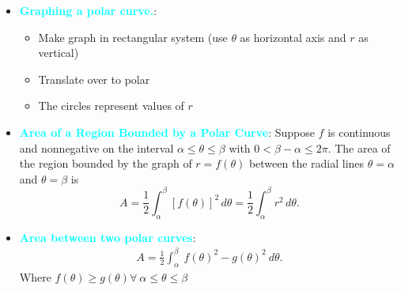 \documentclass{report}
\begin{document}
\begin{itemize}
     \pagebreak 
    \item \textbf{\textcolor{cyan}{Graphing a polar curve.}}:
        \begin{itemize}
            \item Make graph in rectangular system (use $\theta$ as horizontal axis and $r$ as vertical)
            \item Translate over to polar
            \item The circles represent values of $r$
        \end{itemize}
        \item \textbf{\textcolor{cyan}{Area of a Region Bounded by a Polar Curve}}:
             Suppose \( f \) is continuous and nonnegative on the interval \( \alpha \leq \theta \leq \beta \) with \( 0 < \beta - \alpha \leq 2\pi \). The area of the region bounded by the graph of \( r = f(\theta) \) between the radial lines \( \theta = \alpha \) and \( \theta = \beta \) is
                \[ A = \frac{1}{2} \int_{\alpha}^{\beta} [f(\theta)]^2 \, d\theta = \frac{1}{2} \int_{\alpha}^{\beta} r^2 \, d\theta. \]
        \item \textbf{\textcolor{cyan}{Area between two polar curves}}:
            \begin{align*}
                A = \frac{1}{2}\int_{\alpha}^{\beta}\ f(\theta)^{2} -g(\theta )^{2}\ d\theta 
            .\end{align*}
            Where $f(\theta ) \geq g(\theta ) \forall\ \alpha \leq \theta \leq \beta $


\end{itemize}
\end{document}
